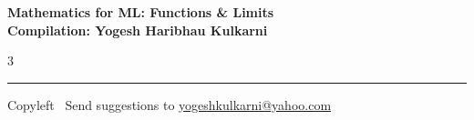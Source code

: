 \documentclass[8pt,landscape]{article}
\begin{document}
\footnotesize


\begin{center}
\Large{\textbf{Mathematics for ML: Functions \& Limits\\ Compilation: Yogesh Haribhau Kulkarni}}
\end{center}

\begin{multicols}{3}

\end{multicols}

\rule{\linewidth}{0.25pt}
\scriptsize
Copyleft \textcopyleft\  Send suggestions to
\href{http://www.yogeshkulkarni.com}{yogeshkulkarni@yahoo.com}
\end{document}
